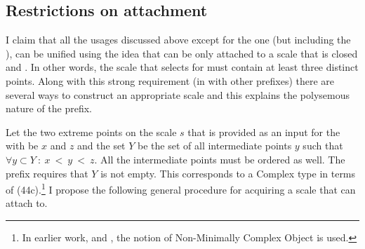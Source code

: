 \subsection{Restrictions on attachment}
I claim that all the usages discussed above except for the  one (but including the ), can be unified using the idea that  can be only attached to a scale that is closed and . In other words, the scale that  selects for must contain at least three distinct points. Along with this strong requirement (in  with other prefixes) there are several ways to construct an appropriate scale and this explains the polysemous nature of the prefix. 

Let the two extreme points on the scale $s$ that is provided as an input for the  with  be $x$ and $z$ and the set $Y$ be the set of all intermediate points $y$ such that $\forall y \subset Y~:~x~<~y~<~z$. All the intermediate points must be ordered as well. The prefix requires that $Y$ is not empty. This corresponds to a Complex type in terms of \citealt{Beavers:12} (44c).\footnote{In earlier work, \citealt{Beavers:02} and \citealt{Beavers:08}, the notion of Non-Minimally Complex Object is used.} I propose the following general procedure for acquiring a scale that  can attach to. 
